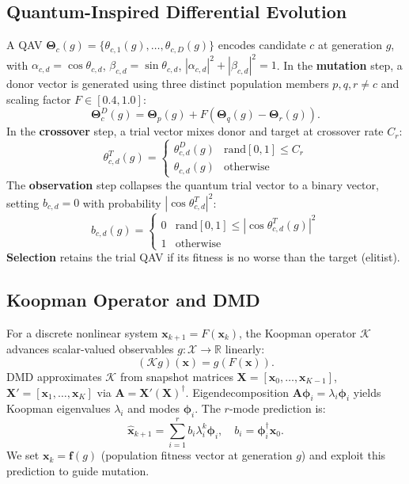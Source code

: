 \documentclass[10pt,twocolumn]{article}
\begin{document}
\subsection{Quantum-Inspired Differential Evolution}
A QAV $\boldsymbol{\Theta}_c(g)=\{\theta_{c,1}(g),\ldots,\theta_{c,D}(g)\}$ encodes candidate $c$ at generation $g$, with $\alpha_{c,d}=\cos\theta_{c,d}$, $\beta_{c,d}=\sin\theta_{c,d}$, $|\alpha_{c,d}|^2{+}|\beta_{c,d}|^2{=}1$. In the \textbf{mutation} step, a donor vector is generated using three distinct population members $p,q,r\ne c$ and scaling factor $F\in[0.4,1.0]$:
\begin{equation}
\boldsymbol{\Theta}^D_c(g)=\boldsymbol{\Theta}_p(g)+F(\boldsymbol{\Theta}_q(g)-\boldsymbol{\Theta}_r(g)).
\label{eq:mutation}
\end{equation}
In the \textbf{crossover} step, a trial vector mixes donor and target at crossover rate $C_r$:
\begin{equation}
\theta^T_{c,d}(g)=\begin{cases}\theta^D_{c,d}(g) & \text{rand}[0,1]\le C_r\\ \theta_{c,d}(g) & \text{otherwise}\end{cases}
\label{eq:crossover}
\end{equation}
The \textbf{observation} step collapses the quantum trial vector to a binary vector, setting $b_{c,d}=0$ with probability $|\cos\theta^T_{c,d}|^2$:
\begin{equation}
b_{c,d}(g)=\begin{cases}0&\text{rand}[0,1]\le|\cos\theta^T_{c,d}(g)|^2\\1&\text{otherwise}\end{cases}
\label{eq:observation}
\end{equation}
\textbf{Selection} retains the trial QAV if its fitness is no worse than the target (elitist).

\subsection{Koopman Operator and DMD}
For a discrete nonlinear system $\mathbf{x}_{k+1}=F(\mathbf{x}_k)$, the Koopman operator $\mathcal{K}$ advances scalar-valued observables $g:\mathcal{X}\to\mathbb{R}$ linearly:
\begin{equation}
(\mathcal{K}g)(\mathbf{x})=g(F(\mathbf{x})).
\label{eq:koopman}
\end{equation}
DMD \cite{ref20} approximates $\mathcal{K}$ from snapshot matrices $\mathbf{X}=[\mathbf{x}_0,\ldots,\mathbf{x}_{K-1}]$, $\mathbf{X}'=[\mathbf{x}_1,\ldots,\mathbf{x}_K]$ via $\mathbf{A}=\mathbf{X}'(\mathbf{X})^\dagger$. Eigendecomposition $\mathbf{A}\boldsymbol{\phi}_i=\lambda_i\boldsymbol{\phi}_i$ yields Koopman eigenvalues $\lambda_i$ and modes $\boldsymbol{\phi}_i$. The $r$-mode prediction is:
\begin{equation}
\hat{\mathbf{x}}_{k+1}=\sum_{i=1}^{r}b_i\lambda_i^{k}\boldsymbol{\phi}_i,\quad b_i=\boldsymbol{\phi}_i^\dagger\mathbf{x}_0.
\label{eq:pred_koopman}
\end{equation}
We set $\mathbf{x}_k=\mathbf{f}(g)$ (population fitness vector at generation $g$) and exploit this prediction to guide mutation.
\end{document}

